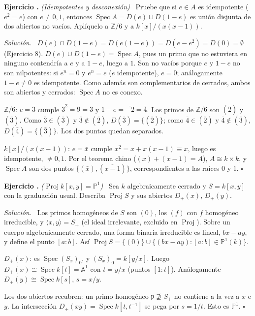 \documentclass[11pt,a4paper]{article}
\newcommand{\Spec}{\operatorname{Spec}}
\newcommand{\Proj}{\operatorname{Proj}}
\newcommand{\ZZ}{\mathbb{Z}}
\newcommand{\A}{\mathbb{A}}
\newcommand{\PP}{\mathbb{P}}
\newcommand{\gen}[1]{\langle #1\rangle}
\newcommand{\p}{\mathfrak{p}}
\newcounter{ej}
\newenvironment{ejercicio}[1]{\refstepcounter{ej}\par\bigskip\noindent\textbf{Ejercicio \theej.} \emph{(#1)}\ }{\par}
\newenvironment{solucion}{\par\smallskip\noindent\textit{Solución.}\ }{\hfill$\square$\par}
\begin{document}
\begin{ejercicio}{Idempotentes y desconexión}
Pruebe que si $e\in A$ es idempotente ($e^2=e$) con $e\ne0,1$, entonces $\Spec A=D(e)\sqcup D(1-e)$ es unión disjunta de dos abiertos no vacíos. Aplíquelo a $\ZZ/6$ y a $k[x]/(x(x-1))$.
\end{ejercicio}
\begin{solucion}
$D(e)\cap D(1-e)=D(e(1-e))=D(e-e^2)=D(0)=\emptyset$ (Ejercicio 8). $D(e)\cup D(1-e)=\Spec A$, pues un primo que no estuviera en ninguno contendría a $e$ y a $1-e$, luego a $1$. Son no vacíos porque $e$ y $1-e$ no son nilpotentes: si $e^n=0$ y $e^n=e$ ($e$ idempotente), $e=0$; análogamente $1-e\ne0$ es idempotente. Como además son complementarios de cerrados, ambos son abiertos y cerrados: $\Spec A$ no es conexo.

$\ZZ/6$: $e=\bar3$ cumple $\bar3^2=\bar9=\bar3$ y $1-e=\bar{-2}=\bar4$. Los primos de $\ZZ/6$ son $(\bar2)$ y $(\bar3)$. Como $\bar3\in(\bar3)$ y $\bar3\notin(\bar2)$, $D(\bar3)=\{(\bar2)\}$; como $\bar4\in(\bar2)$ y $\bar4\notin(\bar3)$, $D(\bar4)=\{(\bar3)\}$. Los dos puntos quedan separados.\par

$k[x]/(x(x-1))$: $e=\bar x$ cumple $x^2=x+x(x-1)\equiv x$, luego es idempotente, $\ne0,1$. Por el teorema chino ($(x)+(x-1)=A$), $A\cong k\times k$, y $\Spec A$ son dos puntos $\{(\bar x),(\overline{x-1})\}$, correspondientes a las raíces $0$ y $1$.
\end{solucion}

\begin{ejercicio}{$\Proj k[x,y]=\PP^1$}
Sea $k$ algebraicamente cerrado y $S=k[x,y]$ con la graduación usual. Describa $\Proj S$ y sus abiertos $D_+(x)$, $D_+(y)$.
\end{ejercicio}
\begin{solucion}
Los primos homogéneos de $S$ son $(0)$, los $(f)$ con $f$ homogéneo irreducible, y $\gen{x,y}=S_+$ (el ideal irrelevante, excluido en $\Proj$). Sobre un cuerpo algebraicamente cerrado, una forma binaria irreducible es lineal, $bx-ay$, y define el punto $[a:b]$. Así $\Proj S=\{(0)\}\cup\{(bx-ay):[a:b]\in\PP^1(k)\}$.

$D_+(x)$: es $\Spec (S_x)_0$, y $(S_x)_0=k[y/x]$. Luego $D_+(x)\cong\Spec k[t]=\A^1$ con $t=y/x$ (puntos $[1:t]$). Análogamente $D_+(y)\cong\Spec k[s]$, $s=x/y$.

Los dos abiertos recubren: un primo homogéneo $\p\not\supseteq S_+$ no contiene a la vez a $x$ e $y$. La intersección $D_+(xy)=\Spec k[t,t^{-1}]$ se pega por $s=1/t$. Esto es $\PP^1$.
\end{solucion}
\end{document}
